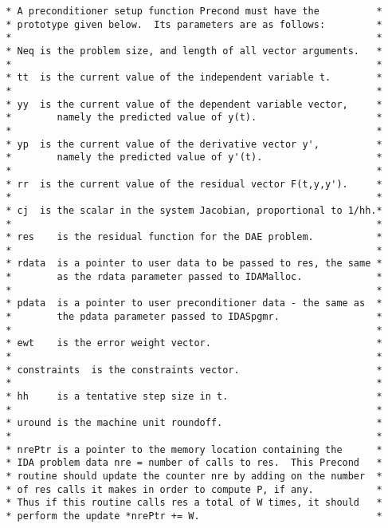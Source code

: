 \begin{verbatim}
 * A preconditioner setup function Precond must have the          *
 * prototype given below.  Its parameters are as follows:         *
 *                                                                *
 * Neq is the problem size, and length of all vector arguments.   *
 *                                                                *
 * tt  is the current value of the independent variable t.        *
 *                                                                *
 * yy  is the current value of the dependent variable vector,     *
 *        namely the predicted value of y(t).                     *
 *                                                                *
 * yp  is the current value of the derivative vector y',          *
 *        namely the predicted value of y'(t).                    *
 *                                                                *
 * rr  is the current value of the residual vector F(t,y,y').     *
 *                                                                *
 * cj  is the scalar in the system Jacobian, proportional to 1/hh.*
 *                                                                *
 * res    is the residual function for the DAE problem.           *
 *                                                                *
 * rdata  is a pointer to user data to be passed to res, the same *
 *        as the rdata parameter passed to IDAMalloc.             *
 *                                                                *
 * pdata  is a pointer to user preconditioner data - the same as  *
 *        the pdata parameter passed to IDASpgmr.                 *
 *                                                                *
 * ewt    is the error weight vector.                             *
 *                                                                *
 * constraints  is the constraints vector.                        *
 *                                                                *
 * hh     is a tentative step size in t.                          *
 *                                                                *
 * uround is the machine unit roundoff.                           *
 *                                                                *
 * nrePtr is a pointer to the memory location containing the      *
 * IDA problem data nre = number of calls to res.  This Precond   *
 * routine should update the counter nre by adding on the number  *
 * of res calls it makes in order to compute P, if any.           *
 * Thus if this routine calls res a total of W times, it should   *
 * perform the update *nrePtr += W.                               *

\end{verbatim}

